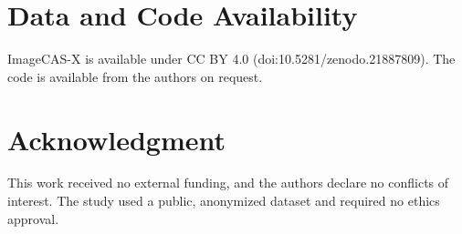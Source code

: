\documentclass[journal]{IEEEtran}
\begin{document}
\section*{Data and Code Availability}
ImageCAS-X is available under CC BY 4.0 (doi:10.5281/zenodo.21887809). The code is available from the authors on request.

\section*{Acknowledgment}
This work received no external funding, and the authors declare no conflicts of interest. The study used a public, anonymized dataset and required no ethics
approval.



\end{document}
